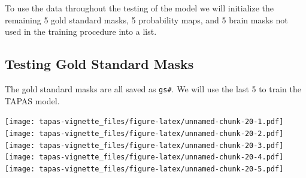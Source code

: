 \documentclass[]{article}
\newenvironment{Shaded}{\begin{snugshade}}{\end{snugshade}}
\newcommand{\CommentTok}[1]{\textcolor[rgb]{0.56,0.35,0.01}{\textit{#1}}}
\newcommand{\DataTypeTok}[1]{\textcolor[rgb]{0.13,0.29,0.53}{#1}}
\newcommand{\KeywordTok}[1]{\textcolor[rgb]{0.13,0.29,0.53}{\textbf{#1}}}
\newcommand{\NormalTok}[1]{#1}
\newcommand{\OperatorTok}[1]{\textcolor[rgb]{0.81,0.36,0.00}{\textbf{#1}}}
\newcommand{\StringTok}[1]{\textcolor[rgb]{0.31,0.60,0.02}{#1}}
\begin{document}
To use the data throughout the testing of the model we will initialize
the remaining 5 gold standard masks, 5 probability maps, and 5 brain
masks not used in the training procedure into a list.

\hypertarget{testing-gold-standard-masks}{%
\subsection{Testing Gold Standard
Masks}\label{testing-gold-standard-masks}}

The gold standard masks are all saved as \texttt{gs\#}. We will use the
last 5 to train the TAPAS model.

\begin{Shaded}
\end{Shaded}

\texttt{[image: tapas-vignette\_files/figure-latex/unnamed-chunk-20-1.pdf]}
\texttt{[image: tapas-vignette\_files/figure-latex/unnamed-chunk-20-2.pdf]}
\texttt{[image: tapas-vignette\_files/figure-latex/unnamed-chunk-20-3.pdf]}
\texttt{[image: tapas-vignette\_files/figure-latex/unnamed-chunk-20-4.pdf]}
\texttt{[image: tapas-vignette\_files/figure-latex/unnamed-chunk-20-5.pdf]}
\end{document}
